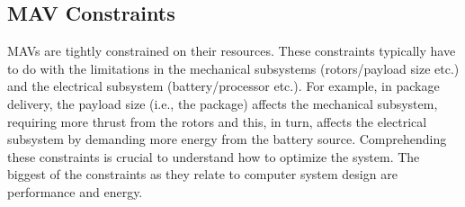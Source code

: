 \subsection{MAV Constraints}
\label{sec:constraints}

MAVs are tightly constrained on their resources. These constraints typically have to do with the limitations in the mechanical subsystems (rotors/payload size etc.) and the electrical subsystem (battery/processor etc.). For example, in package delivery, the payload size (i.e., the package) affects the mechanical subsystem, requiring more thrust from the rotors and this, in turn, affects the electrical subsystem by demanding more energy from the battery source. Comprehending these constraints is crucial to understand how to optimize the system. The biggest of the constraints as they relate to computer system design are performance and energy.

